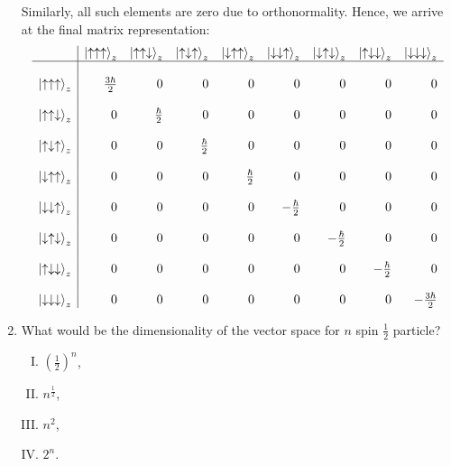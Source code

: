\documentclass[12pt]{article}
\newcommand\half{\frac{1}{2}}
\newcommand\rr{\right \rangle}
\newcommand\ls{\left |}
\newcommand\ua{\uparrow}
\newcommand\da{\downarrow}
\newcommand\hhalf{\frac{\hbar}{2}}
\begin{document}
\begin{enumerate}[1.]
$$$$
Similarly, all such elements are zero due to orthonormality. Hence, we arrive at the final matrix representation:
$$
\begin{array}{c|rrrrrrrr}
\hphantom{\ls \ua \ua \ua \rr _z} & \ls \ua \ua \ua \rr _z  & \ls \ua \ua \da \rr _z & \ls \ua \da \ua \rr _z & \ls \da \ua \ua \rr _z & \ls \da \da \ua \rr _z & \ls \da \ua \da \rr _z & \ls \ua \da \da \rr _z & \ls \da \da \da \rr _z \\
\hline \\
\ls \ua \ua \ua \rr _z & \frac{3\hbar}{2} & 0 & 0 & 0 & 0 & 0 & 0 & 0 \\
\vphantom{\ls \ua \ua \da \rr _z} \\
\ls \ua \ua \da \rr _z & 0 & \hhalf & 0 & 0 & 0 & 0 & 0 & 0 \\
\vphantom{\ls \ua \ua \da \rr _z} \\
\ls \ua \da \ua \rr _z & 0 & 0 & \hhalf & 0 & 0 & 0 & 0 & 0 \\
\vphantom{\ls \ua \ua \da \rr _z} \\
\ls \da \ua \ua \rr _z & 0 & 0 & 0 & \hhalf & 0 & 0 & 0 & 0 \\
\vphantom{\ls \ua \ua \da \rr _z} \\
\ls \da \da \ua \rr _z & 0 & 0 & 0 & 0 & -\hhalf & 0 & 0 & 0 \\
\vphantom{\ls \ua \ua \da \rr _z} \\
\ls \da \ua \da \rr _z & 0 & 0 & 0 & 0 & 0 & -\hhalf & 0 & 0 \\
\vphantom{\ls \ua \ua \da \rr _z} \\
\ls \ua \da \da \rr _z & 0 & 0 & 0 & 0 & 0 & 0 & -\hhalf & 0 \\
\vphantom{\ls \ua \ua \da \rr _z} \\
\ls \da \da \da \rr _z & 0 & 0 & 0 & 0 & 0 & 0 & 0 & -\frac{3\hbar}{2} \\
\end{array}
$$
\newpage
\item What would be the dimensionality of the vector space for $n$ spin $\half$ particle?
       \begin{enumerate}[I.]
              \item $\left(\half\right)^n$,
              \item $n^\half$,
              \item $n^2$,
              \item $2^n$. \\ \newline
       \end{enumerate}

\end{enumerate}
\end{document}
